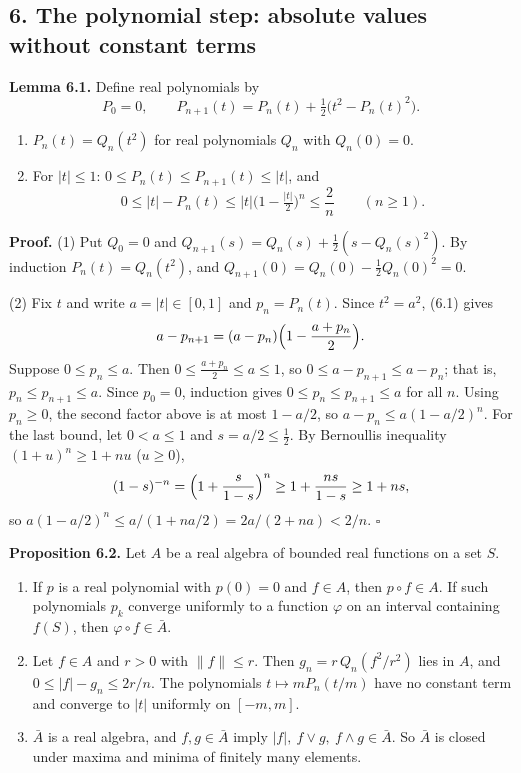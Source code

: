 \documentclass[
  english,
  11pt,
  a4paper,
]{article}
\providecommand{\tightlist}{%
  \setlength{\itemsep}{0pt}\setlength{\parskip}{0pt}}
\begin{document}
\subsection[6. The polynomial step: absolute values without constant
terms]{\texorpdfstring{\protect\hypertarget{the-stone-weierstrass-theorem-for-functions-vanishing-at-infinity--oa-fnd-sw-04}{}{}6.
The polynomial step: absolute values without constant
terms}{6. The polynomial step: absolute values without constant terms}}\label{the-stone-weierstrass-theorem-for-functions-vanishing-at-infinity--OA-FND-SW-04}

\textbf{Lemma 6.1.} Define real polynomials by
\[P_0=0,\qquad P_{n+1}(t)=P_n(t)+\tfrac12\bigl(t^2-P_n(t)^2\bigr).
\tag{6.1}\]

\begin{enumerate}
\tightlist
\item
  \(P_n(t)=Q_n(t^2)\) for real polynomials \(Q_n\) with \(Q_n(0)=0\).
\item
  For \(|t|\leq1\): \(0\leq P_n(t)\leq P_{n+1}(t)\leq|t|\), and
  \[0\leq|t|-P_n(t)\leq|t|\bigl(1-\tfrac{|t|}2\bigr)^n\leq\frac2n\qquad(n\geq1).
  \tag{6.2}\]
\end{enumerate}

\textbf{Proof.} (1) Put \(Q_0=0\) and
\(Q_{n+1}(s)=Q_n(s)+\frac12(s-Q_n(s)^2)\). By induction
\(P_n(t)=Q_n(t^2)\), and \(Q_{n+1}(0)=Q_n(0)-\frac12Q_n(0)^2=0\).

(2) Fix \(t\) and write \(a=|t|\in[0,1]\) and \(p_n=P_n(t)\). Since
\(t^2=a^2\), (6.1) gives
\[a-p_{n+1}=(a-p_n)\Bigl(1-\frac{a+p_n}2\Bigr).\] Suppose
\(0\leq p_n\leq a\). Then \(0\leq\frac{a+p_n}2\leq a\leq1\), so
\(0\leq a-p_{n+1}\leq a-p_n\); that is, \(p_n\leq p_{n+1}\leq a\). Since
\(p_0=0\), induction gives \(0\leq p_n\leq p_{n+1}\leq a\) for all
\(n\). Using \(p_n\geq0\), the second factor above is at most \(1-a/2\),
so \(a-p_n\leq a(1-a/2)^n\). For the last bound, let \(0<a\leq1\) and
\(s=a/2\leq\frac12\). By Bernoulli\textquotesingle s inequality
\((1+u)^n\geq1+nu\) (\(u\geq0\)),
\[(1-s)^{-n}=\Bigl(1+\frac{s}{1-s}\Bigr)^n\geq1+\frac{ns}{1-s}\geq1+ns ,\]
so \(a(1-a/2)^n\leq a/(1+na/2)=2a/(2+na)<2/n\). \(\square\)

\textbf{Proposition 6.2.} Let \(A\) be a real algebra of bounded real
functions on a set \(S\).

\begin{enumerate}
\tightlist
\item
  If \(p\) is a real polynomial with \(p(0)=0\) and \(f\in A\), then
  \(p\circ f\in A\). If such polynomials \(p_k\) converge uniformly to a
  function \(\varphi\) on an interval containing \(f(S)\), then
  \(\varphi\circ f\in\bar A\).
\item
  Let \(f\in A\) and \(r>0\) with \(\|f\|\leq r\). Then
  \(g_n=r\,Q_n(f^2/r^2)\) lies in \(A\), and \(0\leq|f|-g_n\leq2r/n\).
  The polynomials \(t\mapsto mP_n(t/m)\) have no constant term and
  converge to \(|t|\) uniformly on \([-m,m]\).
\item
  \(\bar A\) is a real algebra, and \(f,g\in\bar A\) imply
  \(|f|,\ f\vee g,\ f\wedge g\in\bar A\). So \(\bar A\) is closed under
  maxima and minima of finitely many elements.
\end{enumerate}
\end{document}
